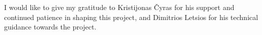 I would like to give my gratitude to Kristijonas \v{C}yras for his support and continued patience in shaping this project, and Dimitrios Letsios for his technical guidance towards the project. 